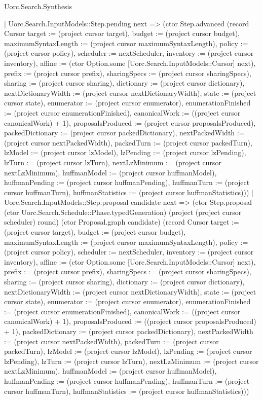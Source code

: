 \begin{lexlean}{Uorc.Search.Synthesis}
\begin{semanticmodule}
{          | Uorc.Search.InputModels::Step.pending next => (ctor Step.advanced (record Cursor {target := (project cursor target), budget := (project cursor budget), maximumSyntaxLength := (project cursor maximumSyntaxLength), policy := (project cursor policy), scheduler := nextScheduler, inventory := (project cursor inventory), affine := (ctor Option.some [Uorc.Search.InputModels::Cursor] next), prefix := (project cursor prefix), sharingSpecs := (project cursor sharingSpecs), sharing := (project cursor sharing), dictionary := (project cursor dictionary), nextDictionaryWidth := (project cursor nextDictionaryWidth), state := (project cursor state), enumerator := (project cursor enumerator), enumerationFinished := (project cursor enumerationFinished), canonicalWork := ((project cursor canonicalWork) + 1), proposalsProduced := (project cursor proposalsProduced), packedDictionary := (project cursor packedDictionary), nextPackedWidth := (project cursor nextPackedWidth), packedTurn := (project cursor packedTurn), lzModel := (project cursor lzModel), lzPending := (project cursor lzPending), lzTurn := (project cursor lzTurn), nextLzMinimum := (project cursor nextLzMinimum), huffmanModel := (project cursor huffmanModel), huffmanPending := (project cursor huffmanPending), huffmanTurn := (project cursor huffmanTurn), huffmanStatistics := (project cursor huffmanStatistics)}))
          | Uorc.Search.InputModels::Step.proposal candidate next => (ctor Step.proposal (ctor Uorc.Search.Schedule::Phase.typedGeneration) (project (project cursor scheduler) round) (ctor Proposal.graph candidate) (record Cursor {target := (project cursor target), budget := (project cursor budget), maximumSyntaxLength := (project cursor maximumSyntaxLength), policy := (project cursor policy), scheduler := nextScheduler, inventory := (project cursor inventory), affine := (ctor Option.some [Uorc.Search.InputModels::Cursor] next), prefix := (project cursor prefix), sharingSpecs := (project cursor sharingSpecs), sharing := (project cursor sharing), dictionary := (project cursor dictionary), nextDictionaryWidth := (project cursor nextDictionaryWidth), state := (project cursor state), enumerator := (project cursor enumerator), enumerationFinished := (project cursor enumerationFinished), canonicalWork := ((project cursor canonicalWork) + 1), proposalsProduced := ((project cursor proposalsProduced) + 1), packedDictionary := (project cursor packedDictionary), nextPackedWidth := (project cursor nextPackedWidth), packedTurn := (project cursor packedTurn), lzModel := (project cursor lzModel), lzPending := (project cursor lzPending), lzTurn := (project cursor lzTurn), nextLzMinimum := (project cursor nextLzMinimum), huffmanModel := (project cursor huffmanModel), huffmanPending := (project cursor huffmanPending), huffmanTurn := (project cursor huffmanTurn), huffmanStatistics := (project cursor huffmanStatistics)}))
}
\end{semanticmodule}
\end{lexlean}
